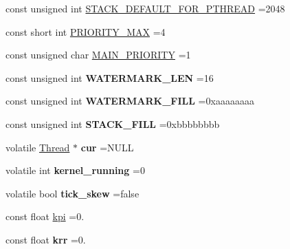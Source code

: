 \begin{DoxyCompactItemize}
\item 
const unsigned int \hyperlink{group___settings_ga466ea8e233d84803e31f3e9d9d978cfd}{S\-T\-A\-C\-K\-\_\-\-D\-E\-F\-A\-U\-L\-T\-\_\-\-F\-O\-R\-\_\-\-P\-T\-H\-R\-E\-A\-D} =2048
\item 
const short int \hyperlink{group___settings_ga8c0365b6cd111f990937319e4499962b}{P\-R\-I\-O\-R\-I\-T\-Y\-\_\-\-M\-A\-X} =4
\item 
const unsigned char \hyperlink{group___settings_gad66abb7a060d94617390e1838e4e3b01}{M\-A\-I\-N\-\_\-\-P\-R\-I\-O\-R\-I\-T\-Y} =1
\item 
\hypertarget{group___settings_ga2f7cc48763637383c21abd9ae3d2edc4}{const unsigned int {\bfseries W\-A\-T\-E\-R\-M\-A\-R\-K\-\_\-\-L\-E\-N} =16}\label{group___settings_ga2f7cc48763637383c21abd9ae3d2edc4}

\item 
\hypertarget{group___settings_ga8552b5dd1e93ec344d19968081456953}{const unsigned int {\bfseries W\-A\-T\-E\-R\-M\-A\-R\-K\-\_\-\-F\-I\-L\-L} =0xaaaaaaaa}\label{group___settings_ga8552b5dd1e93ec344d19968081456953}

\item 
\hypertarget{group___settings_ga642012224763c5e1fa86ada22e5165fb}{const unsigned int {\bfseries S\-T\-A\-C\-K\-\_\-\-F\-I\-L\-L} =0xbbbbbbbb}\label{group___settings_ga642012224763c5e1fa86ada22e5165fb}

\item 
\hypertarget{namespacemiosix_afb248420b6e0fb8c11f63e6f15eafdce}{volatile \hyperlink{classmiosix_1_1_thread}{Thread} $\ast$ {\bfseries cur} =N\-U\-L\-L}\label{namespacemiosix_afb248420b6e0fb8c11f63e6f15eafdce}

\item 
\hypertarget{namespacemiosix_ad256223f6dd182b331163497824a7c52}{volatile int {\bfseries kernel\-\_\-running} =0}\label{namespacemiosix_ad256223f6dd182b331163497824a7c52}

\item 
\hypertarget{namespacemiosix_a6791268dbd6f51e58607684cf56ef372}{volatile bool {\bfseries tick\-\_\-skew} =false}\label{namespacemiosix_a6791268dbd6f51e58607684cf56ef372}

\item 
const float \hyperlink{namespacemiosix_ab26854f238450057e4b1eb3687ac4f88}{kpi} =0.
\item 
\hypertarget{namespacemiosix_adf08f1a6c8b1f38c65a7e7be384eb69b}{const float {\bfseries krr} =0.}\label{namespacemiosix_adf08f1a6c8b1f38c65a7e7be384eb69b}


\end{DoxyCompactItemize}
